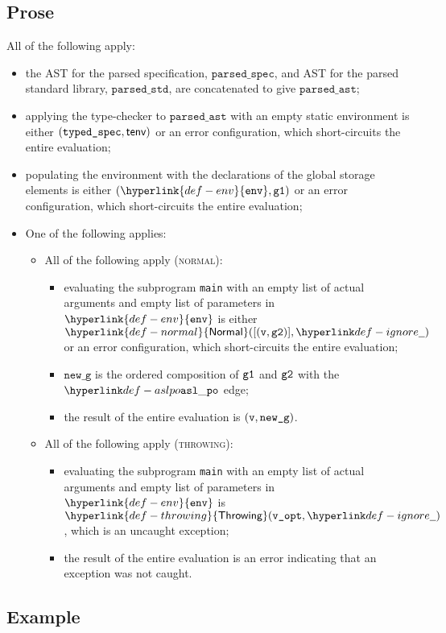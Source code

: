\documentclass{book}
\newcommand\ProseOrError[0]{or an error configuration, which short-circuits the entire evaluation}
\newcommand\Normal[0]{\hyperlink{def-normal}{\textsf{Normal}}}
\newcommand\Throwing[0]{\hyperlink{def-throwing}{\textsf{Throwing}}}
\newcommand\parsedspec[0]{\texttt{parsed\_spec}}
\newcommand\parsedstd[0]{\texttt{parsed\_std}}
\newcommand\parsedast[0]{\texttt{parsed\_ast}}
\newcommand\typedspec[0]{\texttt{typed\_spec}}
\newcommand\env[0]{\hyperlink{def-env}{\texttt{env}}}
\newcommand\newg[0]{\texttt{new\_g}}
\begin{document}
\subsection{Prose}
  All of the following apply:
  \begin{itemize}
    \item the AST for the parsed specification, $\parsedspec$, and AST for the parsed standard library,
    $\parsedstd$, are concatenated to give $\parsedast$;
    \item applying the type-checker to $\parsedast$ with an empty static environment is either
    $(\typedspec, \tenv)$ \ProseOrError;
    \item populating the environment with the declarations of the global storage elements
    is either $(\env, \vgone)$ \ProseOrError;
    \item One of the following applies:
    \begin{itemize}
      \item All of the following apply (\textsc{normal}):
      \begin{itemize}
        \item evaluating the subprogram \texttt{main} with an empty list of actual arguments and empty list of parameters
        in $\env$ is either $\Normal([(\vv, \vgtwo)], \Ignore)$ \ProseOrError;
        \item $\newg$ is the ordered composition of $\texttt{g1}$ and $\texttt{g2}$ with the $\aslpo$ edge;
        \item the result of the entire evaluation is $(\vv, \newg)$.
      \end{itemize}

      \item All of the following apply (\textsc{throwing}):
      \begin{itemize}
        \item evaluating the subprogram \texttt{main} with an empty list of actual arguments and empty list of parameters
        in $\env$ is $\Throwing(\texttt{v\_opt}, \Ignore)$, which is an uncaught exception;
        \item the result of the entire evaluation is an error indicating that an exception was not caught.
      \end{itemize}
    \end{itemize}
  \end{itemize}

  \subsection{Example}
\end{document}
